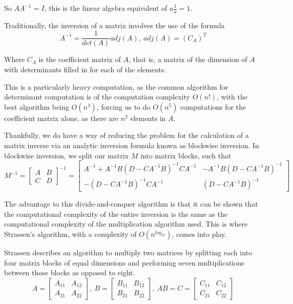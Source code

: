 \documentclass[12pt, letterpaper]{article}
\theoremstyle{remark}
\theoremstyle{remark}
\begin{document}
    So \(AA^{-1} = I\), this is the linear algebra equivalent of \(a\frac{1}{a} = 1\).

    \bigskip

    Traditionally, the inversion of a matrix involves the use of the formula
    \[A^{-1} = \frac{1}{det(A)}adj(A),\ adj(A) = (C_{A})^T\]

    Where \(C_A\) is the coefficient matrix of \(A\), that is, a matrix of 
    the dimension of \(A\) with determinants filled in for each of the elements.

    This is a particularly heavy computation, as the common algorithm for determinant
    computation is of the computation complexity \(O(n!)\), with the best algorithm 
    being \(O(n^3)\), forcing us to do \(O(n^5)\) computations for the coefficient 
    matrix alone, as there are \(n^2\) elements in \(A\).

    \bigskip

    Thankfully, we do have a way of reducing the problem for the calculation of 
    a matrix inverse via an analytic inversion formula known as blockwise inversion. 
    In blockwise inversion, we split our matrix \(M\) into matrix blocks, such that
    \[M^{-1} = \begin{bmatrix*}
        A & B \\
        C & D
    \end{bmatrix*}^{-1} = 
    \begin{bmatrix*}
        A^{-1} + A^{-1}B(D - CA^{-1}B)^{-1}CA^{-1} & -A^{-1}B(D - CA^{-1}B)^{-1} \\
        -(D - CA^{-1}B)^{-1}CA^{-1} & (D - CA^{-1}B)^{-1}
    \end{bmatrix*}\]
    
    The advantage to this divide-and-conquer algorithm is that it can be shown 
    that the computational complexity of the entire inversion is the same as the
    computational complexity of the multiplication algorithm used. This is where 
    Strassen's algorithm, with a complexity of \(O(n^{log_27})\), comes into play.

    \bigskip

    Strassen describes an algorithm to multiply two matrices by splitting
    each into four matrix blocks of equal dimensions and performing seven multiplications
    between those blocks as opposed to eight.
    \[A = \begin{bmatrix*}
        A_{11} & A_{12} \\
        A_{21} & A_{22}
    \end{bmatrix*},\ B =
    \begin{bmatrix*}
        B_{11} & B_{12} \\
        B_{21} & B_{22}
    \end{bmatrix*},\ AB = C =
    \begin{bmatrix*}
        C_{11} & C_{12} \\
        C_{21} & C_{22}
    \end{bmatrix*}\]
\end{document}
